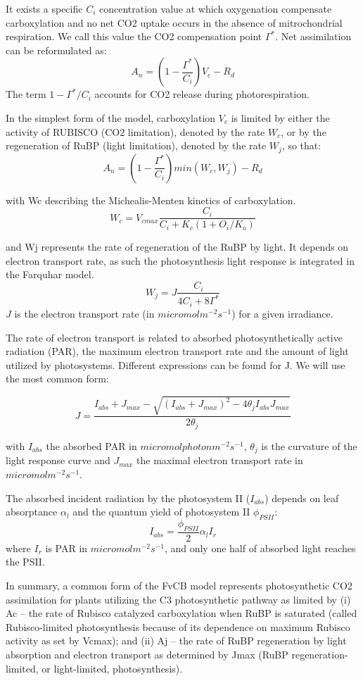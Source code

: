 \documentclass[12pt,oneside]{book}
\begin{document}
It exists a specific \(C_i\) concentration value at which oxygenation
compensate carboxylation and no net CO2 uptake occurs in the absence of
mitrochondrial respiration. We call this value the CO2 compensation
point \(\Gamma^*\). Net assimilation can be reformulated as: \[
A_n=(1-\frac{\Gamma^*}{C_i})V_c-R_d
\] The term \(1-\Gamma^*/C_i\) accounts for CO2 release during
photorespiration.

In the simplest form of the model, carboxylation \(V_c\) is limited by
either the activity of RUBISCO (CO2 limitation), denoted by the rate
\(W_c\), or by the regeneration of RuBP (light limitation), denoted by
the rate \(W_j\), so that: \[
A_n=(1-\frac{\Gamma^*}{C_i})min(W_c,W_j)-R_d
\]

with Wc describing the Michealis-Menten kinetics of carboxylation. \[
W_c=V_{cmax}\frac{C_i}{C_i+K_c(1+O_i/K_o)}
\]

and Wj represents the rate of regeneration of the RuBP by light. It
depends on electron transport rate, as such the photosynthesis light
response is integrated in the Farquhar model.\\
\[
W_j=J\frac{C_i}{4C_i+8\Gamma^*}
\] \(J\) is the electron transport rate (in \(micromol m^{-2} s^{-1}\))
for a given irradiance.

The rate of electron transport is related to absorbed photosynthetically
active radiation (PAR), the maximum electron transport rate and the
amount of light utilized by photosystems. Different expressions can be
found for J. We will use the most common form:

\[
J=\frac{I_{abs}+J_{max}-\sqrt{(I_{abs}+J_{max})^2-4\theta_jI_{abs}J_{max}}}{2\theta_j}
\]

with \(I_{abs}\) the absorbed PAR in \(micromol photon m^{-2} s^{-1}\),
\(\theta_j\) is the curvature of the light response curve and
\(J_{max}\) the maximal electron transport rate in
\(micromol m^{-2} s^{-1}\).

The absorbed incident radiation by the photosystem II (\(I_{abs}\))
depends on leaf absorptance \(\alpha_l\) and the quantum yield of
photosystem II \(\phi_{PSII}\): \[
I_{abs}=\frac{\phi_{PSII}}{2}\alpha_lI_r
\] where \(I_r\) is PAR in \(micromol m^{-2} s^{-1}\), and only one half
of absorbed light reaches the PSII.

In summary, a common form of the FvCB model represents photosynthetic
CO2 assimilation for plants utilizing the C3 photosynthetic pathway as
limited by (i) Ac -- the rate of Rubisco catalyzed carboxylation when
RuBP is saturated (called Rubisco-limited photosynthesis because of its
dependence on maximum Rubisco activity as set by Vcmax); and (ii) Aj --
the rate of RuBP regeneration by light absorption and electron transport
as determined by Jmax (RuBP regeneration-limited, or light-limited,
photosynthesis).
\end{document}
